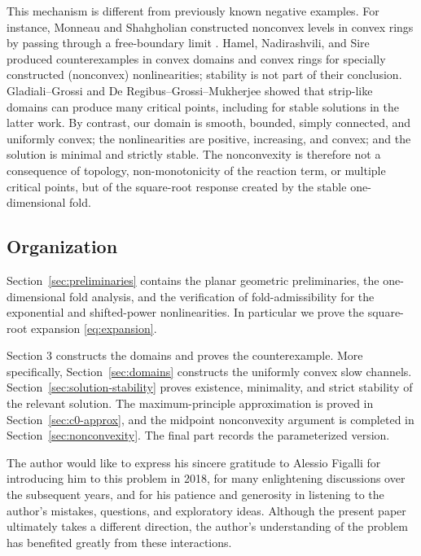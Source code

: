\documentclass[reqno,12pt]{amsart}
\numberwithin{equation}{section}
\theoremstyle{remark}
\begin{document}
This mechanism is different from previously known negative examples. For instance, 
Monneau and Shahgholian \cite{MS2005} constructed nonconvex levels in convex rings by passing
through a free-boundary limit \cite{A1989}.  Hamel, Nadirashvili, and Sire \cite{HNS2016} produced counterexamples in convex domains and convex rings for specially constructed (nonconvex) nonlinearities; stability is not part of their conclusion.  Gladiali--Grossi \cite{GG2022} and De Regibus--Grossi--Mukherjee \cite{DG2022} showed that
strip-like domains can produce many critical points, including for stable solutions in the latter work.  By contrast, our domain is smooth, bounded, simply connected, and uniformly convex; the nonlinearities are
positive, increasing, and convex; and the solution is minimal and strictly stable.  The nonconvexity is therefore not a consequence of topology, non-monotonicity of the reaction term, or multiple critical points, but of the
square-root response created by the stable one-dimensional fold. 

\subsection*{Organization}

Section~\ref{sec:preliminaries} contains the planar geometric preliminaries, the one-dimensional fold analysis, and the verification of fold-admissibility for the exponential and shifted-power nonlinearities.  In particular we prove the square-root expansion
\eqref{eq:expansion}. 

Section 3 constructs the domains and proves the counterexample. More specifically, Section~\ref{sec:domains} constructs the uniformly convex slow channels.  Section~\ref{sec:solution-stability} proves existence,
minimality, and strict stability of the relevant solution.  The maximum-principle approximation is proved in Section~\ref{sec:c0-approx}, and the midpoint
nonconvexity argument is completed in Section~\ref{sec:nonconvexity}.  The final
part records the parameterized version.

\medskip
{} The author would like to express his sincere gratitude to Alessio Figalli for introducing him to this problem in 2018, for many enlightening discussions over the subsequent years, and for his patience and generosity in listening to the author's mistakes, questions, and exploratory ideas. Although the present paper ultimately takes a different direction, the author's understanding of the problem has benefited greatly from these interactions.
\end{document}
